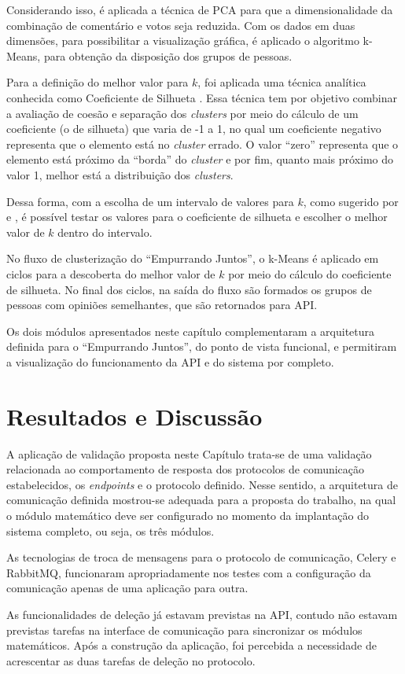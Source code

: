     Considerando isso, é aplicada a técnica de PCA para que
    a dimensionalidade da combinação de comentário e votos seja reduzida. 
    Com os dados em duas dimensões, para possibilitar a visualização gráfica, 
    é aplicado o algoritmo k-Means, para obtenção da disposição dos grupos de pessoas. 
    
    Para a definição do melhor valor para $k$, foi aplicada uma técnica analítica conhecida como Coeficiente de Silhueta \cite{tan2013data}.  
    Essa técnica tem por objetivo combinar a avaliação de coesão e separação dos \textit{clusters} por meio do cálculo de um coeficiente (o de silhueta) que 
    varia de -1 a 1, no qual um coeficiente negativo representa que o elemento está no \textit{cluster} errado.
    O valor ``zero'' representa que o elemento está próximo da ``borda'' do \textit{cluster} e por fim, quanto mais próximo do valor 1, melhor
    está a distribuição dos \textit{clusters}.

    Dessa forma, com a escolha de um intervalo de valores para $k$, como sugerido por  e , é possível testar os valores 
    para o coeficiente de silhueta e escolher o melhor valor de $k$ dentro do intervalo. 

    No fluxo de clusterização do ``Empurrando Juntos'', o k-Means é aplicado em ciclos para a descoberta do melhor valor de 
    $k$ por meio do cálculo do coeficiente de silhueta.
    No final dos ciclos, na saída do fluxo são formados os grupos de pessoas com opiniões semelhantes, que são retornados para API.
 
    Os dois módulos apresentados neste capítulo complementaram a arquitetura definida para o ``Empurrando Juntos'',
    do ponto de vista funcional, e permitiram a visualização do funcionamento da API e do sistema por completo.
    
    \section{Resultados e Discussão}
    
    A aplicação de validação proposta neste Capítulo trata-se de uma validação relacionada ao comportamento de resposta
    dos protocolos de comunicação estabelecidos, os \textit{endpoints}
    e o protocolo definido. Nesse sentido, a arquitetura de comunicação definida mostrou-se adequada 
    para a proposta do trabalho, na qual o módulo matemático deve ser configurado no momento da implantação do sistema completo, 
    ou seja, os três módulos. 
    
    As tecnologias de troca de mensagens para o protocolo de comunicação, Celery e RabbitMQ, funcionaram 
    apropriadamente nos testes com a configuração
    da comunicação apenas de uma aplicação para outra. 
    
    As funcionalidades de deleção já estavam previstas na API, contudo não estavam previstas tarefas na interface
    de comunicação para sincronizar os módulos matemáticos. Após a construção da aplicação, foi percebida a necessidade de acrescentar
    as duas tarefas de deleção no protocolo.
    
    
    
    
      
      